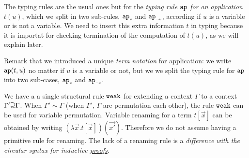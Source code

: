 \documentclass{article}
\begin{document}
The typing rules are the usual ones but for %
the \emph{typing rule ${\tt ap}$ for an application} $t(u)$, which we split in two sub-rules, ${{\tt ap}_{\mbox{\tiny $v$}}}$
and ${{\tt ap}_{\mbox{\tiny $\neg v$}}}$, according if $u$ is a variable or is not a variable.
We need to insert this extra information $t$ in typing because it is importat for checking termination
of the computation of $t(u)$, as we will explain later.

Remark that we introduced a unique \emph{term notation}
for application: we write ${\tt ap}(t,u)$ no matter if $u$ is a variable or not, but we we split 
the typing rule for ${\tt ap}$ into two sub-cases, ${{\tt ap}_{\mbox{\tiny $v$}}}$ and ${{\tt ap}_{\mbox{\tiny $\neg v$}}}$.

We have a a single structural rule ${\tt weak}$ for extending a context $\Gamma$ to a context 
$\Gamma' \supseteqsim \Gamma$. When $\Gamma' \sim \Gamma$ (when 
$\Gamma'$, $\Gamma$ are permutation each other), 
the rule ${\tt weak}$ can be used for variable permutation.
Variable renaming for a term $t[\vec{x}]$ can be obtained by writing 
$(\lambda \vec{x}.t[\vec{x}])(\vec{x'})$. 
Therefore we do not assume having a primitive rule for renaming. 
The lack of a renaming rule is a 
\emph{difference with the circular syntax for inductive \underline{proofs}}.

\end{document}
